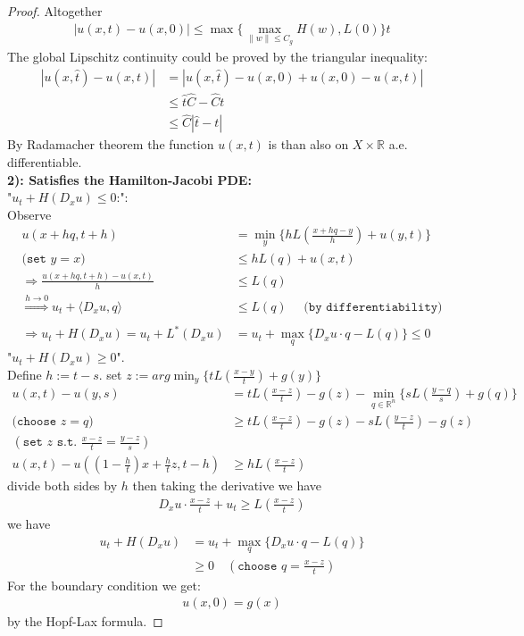 \begin{proof}
	Altogether
	\begin{align*}
		|u(x, t) - u(x, 0)| \le \max \bigg\{\max_{\|w\| \le C_g} H(w), L(0)\bigg\}t 
	\end{align*}
	The global Lipschitz continuity could be proved by the triangular inequality:
	\begin{align*}
		|u(x, \hat{t}) - u(x, t)| &=| u(x, \hat{t}) - u(x, 0) + u(x, 0) - u(x, t) |\\
		&\le \hat{t} \hat{C} - \hat{C} t\\
		&\le \hat{C}|\hat{t} - t|  
	\end{align*}
	By Radamacher theorem the function $u(x, t)$ is than also on $X \times \mathbb{R}$ a.e. differentiable. \\
	\textbf{2): Satisfies the Hamilton-Jacobi PDE:} \\
	"$u_t + H(D_x u) \le 0$:": \\
	Observe
	\begin{align*}
		u(x + hq, t + h)&= \min_y \biggl\{ h L(\frac{x + hq - y}{h}) + u(y, t)\biggr\} \\
		\texttt{(set $y = x$)} \quad 
		&\le h L(q) + u(x, t) \\
		\Rightarrow 
		\frac{u(x+ hq, t + h) - u(x, t)}{h} &\le L(q)\\
		\overset{h \rightarrow 0}{\Rightarrow} u_t + \langle D_x u, q \rangle &\le L(q) \quad \texttt{ (by differentiability})\\ 
		\\\Rightarrow
		u_t + H(D_x u) = u_t + L^*(D_x u) &=  u_t + \max_q \{ D_x u \cdot q - L(q)\}\le 0
	\end{align*}
	"$u_t + H(D_x u) \ge 0$".\\
	Define $h := t - s$. set $z := arg \min_y \{ t L (\frac{x - y}{t}) + g(y) \}$
	\begin{align*}
		u(x, t) - u(y, s) &=  tL(\frac{x - z}{t}) - g(z) - \min_{q \in \mathbb{R}^n} \{ s L(\frac{y - q}{s}) + g(q) \} \\
		\texttt{(choose $z = q$)}
		&\ge tL(\frac{x - z}{t}) - g(z) - sL(\frac{y - z}{t}) - g(z)\\
	(\texttt{set $z$ s.t. $\frac{x - z}{t} = \frac{y - z}{s}$})\\
		u(x, t) - u((1-\frac{h}{t}) x + \frac{h}{t}z  , t - h) &\geq h  L(\frac{x - z}{t})
	\end{align*}
	divide both sides by $h$ then taking the derivative we have
	\begin{align*}
		D_x u \cdot \frac{x - z}{t} + u_t \geq L(\frac{ x - z}{t})
	\end{align*}
	we have
	\begin{align*}
		u_t + H(D_x u) &= u_t + \max_q\{ D_x u \cdot q - L(q)\}\\
		&\ge 0 \quad (\texttt{choose }q = \frac{x - z }{t})
	\end{align*}
	For the boundary condition we get:
	\begin{align*}
		u(x, 0) = g(x)
	\end{align*}
	by the Hopf-Lax formula.
\end{proof}

